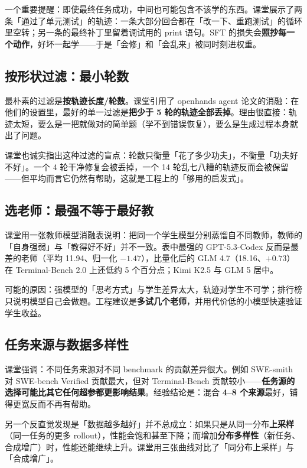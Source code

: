 \documentclass[a4paper]{article}
\begin{document}
一个重要提醒：即使最终任务成功，中间也可能包含不该学的东西。课堂展示了两条「通过了单元测试」的轨迹：一条大部分回合都在「改一下、重跑测试」的循环里空转；另一条的最终补丁里留着调试用的 print 语句。SFT 的损失会\textbf{照抄每一个动作}，好坏一起学——于是「会修」和「会乱来」被同时刻进权重。

\subsection{按形状过滤：最小轮数}

最朴素的过滤是\textbf{按轨迹长度/轮数}。课堂引用了 openhands agent 论文的消融：在他们的设置里，最好的单一过滤是\textbf{把少于 5 轮的轨迹全部丢掉}。理由很直接：轨迹太短，要么是一把就做对的简单题（学不到错误恢复），要么是生成过程本身就出了问题。

课堂也诚实指出这种过滤的盲点：轮数只衡量「花了多少功夫」，不衡量「功夫好不好」。一个 4 轮干净修复会被丢掉，一个 14 轮乱七八糟的轨迹反而会被保留——但平均而言它仍然有帮助，这就是工程上的「够用的启发式」。

\subsection{选老师：最强不等于最好教}

课堂用一张教师模型消融表说明：把同一个学生模型分别蒸馏自不同教师，教师的「自身强弱」与「教得好不好」并不一致。表中最强的 GPT-5.3-Codex 反而是最差的老师（平均 11.94、归一化 $-1.47$），比量化后的 GLM 4.7（18.16、$+0.73$）在 Terminal-Bench 2.0 上还低约 5 个百分点；Kimi K2.5 与 GLM 5 居中。

可能的原因：强模型的「思考方式」与学生差异太大，轨迹对学生不可学；排行榜只说明模型自己会做题。工程建议是\textbf{多试几个老师}，并用代价低的小模型快速验证学生收益。

\subsection{任务来源与数据多样性}

课堂强调：不同任务来源对不同 benchmark 的贡献差异很大。例如 SWE-smith 对 SWE-bench Verified 贡献最大，但对 Terminal-Bench 贡献较小——\textbf{任务源的选择可能比其它任何超参都更影响结果}。经验结论是：混合 \textbf{4--8 个来源}最好，铺得更宽反而不再有帮助。

另一个反直觉发现是「数据越多越好」并不总成立：如果只是从同一分布\textbf{上采样}（同一任务的更多 rollout），性能会饱和甚至下降；而增加\textbf{分布多样性}（新任务、合成增广）时，性能还能继续上升。课堂用三张曲线对比了「同分布上采样」与「合成增广」。
\end{document}
